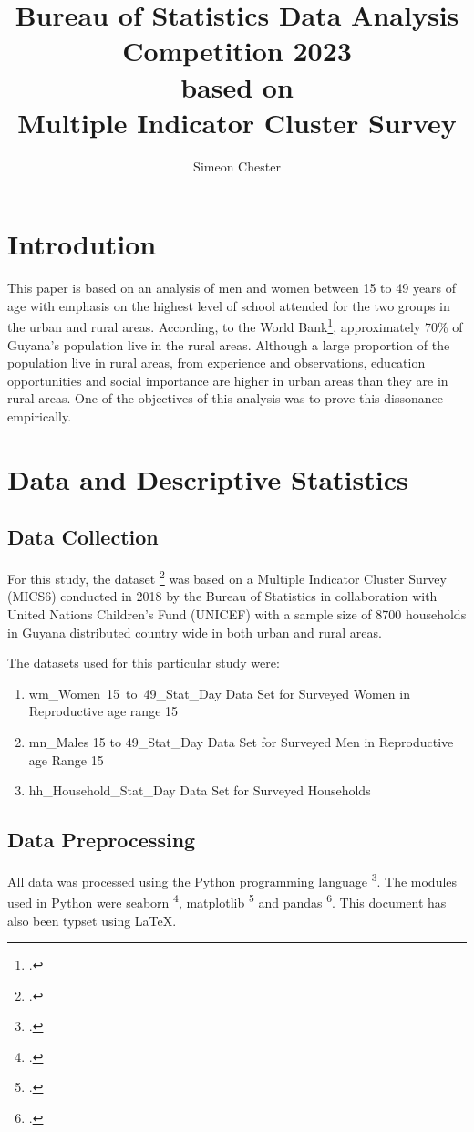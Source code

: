 \documentclass[stu, 12pt, floatsintext,longtable]{apa7}
\author{Simeon Chester}
\title{Bureau of Statistics Data Analysis Competition 2023 \\ based on \\
    Multiple Indicator Cluster Survey}
\begin{document}
\maketitle

\section{Introdution}

This paper is based on an analysis of men and women between 15 to 49 years of
age with emphasis on the highest level of school attended for the two groups in
the urban and rural areas. According, to the World Bank\footcite[World
    Bank][]{worldbankruralpop},
approximately 70\% of Guyana's population live in the rural areas. Although a
large proportion of the population live in rural areas, from
experience and observations, education opportunities and social importance
are higher in urban areas than they are in rural areas. One of the objectives
of this analysis was to prove this dissonance empirically.
\section{Data and Descriptive Statistics}
\subsection{Data Collection}

For this study, the dataset \footcite{dataset} was based on a Multiple
Indicator Cluster Survey
(MICS6) conducted in 2018 by the Bureau of Statistics in collaboration with
United Nations Children's Fund (UNICEF) with a sample size of 8700 households
in Guyana
distributed country wide in both urban and rural areas.

The datasets used for this particular study were:
\begin{enumerate}
    \item wm\_Women\ 15\ to\ 49\_Stat\_Day \- Data Set for Surveyed Women in
          Reproductive
          age range 15 
    \item mn\_Males 15 to 49\_Stat\_Day \- Data Set for Surveyed Men in
          Reproductive
          age Range 15 
    \item hh\_Household\_Stat\_Day \- Data Set for Surveyed Households
\end{enumerate}
\subsection{Data Preprocessing}
All data was processed using the Python programming language \footcite{python}.
The
modules used
in Python were seaborn \footcite{seaborn}, matplotlib \footcite{matplotlib} and
pandas \footcite{pandas}. This document has also been
typset using \LaTeX.
\end{document}
